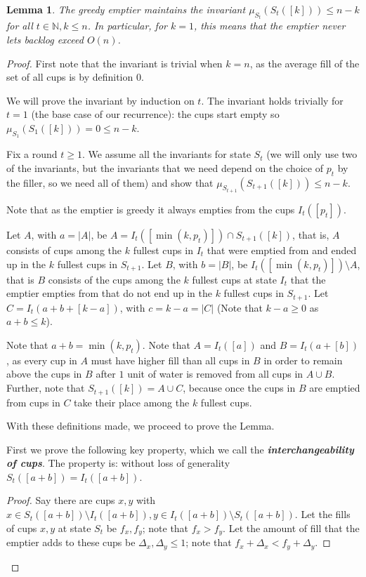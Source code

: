 \documentclass[twocolumn]{article}[11pt]
\newcommand{\defn}[1]{{\textit{\textbf{\boldmath #1}}}}
\newtheorem{lemma}{Lemma}
\begin{document}
\begin{lemma}
  The greedy emptier maintains the invariant $\mu_{S_t}(S_t([k])) \le n-k$ for
  all $t\in\mathbb{N}, k \le n$. In particular, for $k=1$, this means that the
  emptier never lets backlog exceed $O(n)$.
\end{lemma}
\begin{proof}
First note that the invariant is trivial when $k=n$, as the average fill of the
set of all cups is by definition $0$.

We will prove the invariant by induction on $t$.
The invariant holds trivially for $t=1$ (the base case of our recurrence): 
the cups start empty so $\mu_{S_1}(S_1([k])) = 0 \le n-k$.

Fix a round $t \ge 1$. We assume all the invariants for state $S_t$ (we will
only use two of the invariants, but the invariants that we need depend on the
choice of $p_t$ by the filler, so we need all of them) and show that
$\mu_{S_{t+1}}(S_{t+1}([k])) \le n-k$. 

Note that as the emptier is greedy it always empties from the cups $I_t([p_t])$.

Let $A$, with $a=|A|$, be $A = I_t([\min(k, p_t)]) \cap S_{t+1}([k])$, that is, $A$
consists of cups among the $k$ fullest cups in $I_t$ that were emptied from and
ended up in the $k$ fullest cups in $S_{t+1}$.
Let $B$, with $b=|B|$, be $I_t([\min(k, p_t)]) \setminus A$, that is $B$ consists of
the cups among the $k$ fullest cups at state $I_t$ that the emptier empties
from that do not end up in the $k$ fullest cups in $S_{t+1}$. 
Let $C = I_t(a+b+[k-a])$, with $c=k-a = |C|$ (Note that $k-a\ge 0$ as $a+b \le k$). 

Note that $a+ b = \min(k, p_t)$.
Note that $A = I_t([a])$ and $B = I_t(a+[b])$, as every cup in $A$
must have higher fill than all cups in $B$ in order to remain above the cups in
$B$ after $1$ unit of water is removed from all cups in $A\cup B$.
Further, note that $S_{t+1}([k]) = A \cup C$, because once the cups in $B$
are emptied from cups in $C$ take their place among the $k$ fullest cups.

With these definitions made, we proceed to prove the Lemma.

First we prove the following key property, which we call the \defn{interchangeability of cups}.
The property is: without loss of generality $S_t([a+b]) = I_t([a+b])$.
\begin{proof}
  Say there are cups $x, y$ with $x\in S_t([a+b]) \setminus I_t([a+b]), y \in
  I_t([a+b])\setminus S_t([a+b])$. Let the fills of cups $x,y$ at state $S_t$
  be $f_x, f_y$; note that $f_x > f_y$. Let the amount of fill that the emptier
  adds to these cups be $\Delta_x, \Delta_y \le 1$; note that $f_x +\Delta_x <
  f_y + \Delta_y$.


\end{proof}
\end{proof}
\end{document}
